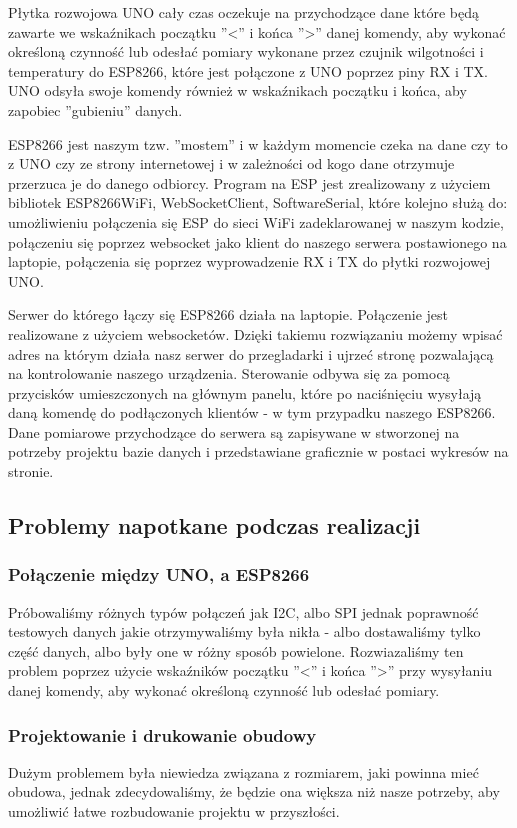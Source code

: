 \documentclass[12pt]{article}
\begin{document}
Płytka rozwojowa UNO cały czas oczekuje na przychodzące dane które będą zawarte we wskaźnikach początku ''<'' i końca ''>'' danej komendy, aby wykonać określoną czynność lub odesłać pomiary wykonane przez czujnik wilgotności i temperatury do ESP8266, które jest połączone z UNO poprzez piny RX i TX. UNO odsyła swoje komendy również w wskaźnikach początku i końca, aby zapobiec ''gubieniu'' danych.

ESP8266 jest naszym tzw. ''mostem'' i w każdym momencie czeka na dane czy to z UNO czy ze strony internetowej i w zależności od kogo dane otrzymuje przerzuca je do danego odbiorcy.
Program na ESP jest zrealizowany z użyciem bibliotek ESP8266WiFi, WebSocketClient, SoftwareSerial, które kolejno służą do: umożliwieniu połączenia się ESP do sieci WiFi zadeklarowanej w naszym kodzie, połączeniu się poprzez websocket jako klient do naszego serwera postawionego na laptopie, połączenia się poprzez wyprowadzenie RX i TX do płytki rozwojowej UNO.

Serwer do którego łączy się ESP8266 działa na laptopie. Połączenie jest realizowane z użyciem websocketów. Dzięki takiemu rozwiązaniu możemy wpisać adres na którym działa nasz serwer do przegladarki i ujrzeć stronę pozwalającą na kontrolowanie naszego urządzenia. Sterowanie odbywa się za pomocą przycisków umieszczonych na głównym panelu, które po naciśnięciu wysyłają daną komendę do podłączonych klientów - w tym przypadku naszego ESP8266. Dane pomiarowe przychodzące do serwera są zapisywane w stworzonej na potrzeby projektu bazie danych i przedstawiane graficznie w postaci wykresów na stronie.

\newpage
\subsection{Problemy napotkane podczas realizacji}
\subsubsection{Połączenie między UNO, a ESP8266}
Próbowaliśmy różnych typów połączeń jak I2C, albo SPI jednak poprawność testowych danych jakie otrzymywaliśmy była nikła - albo dostawaliśmy tylko część danych, albo były one w różny sposób powielone.
Rozwiazaliśmy ten problem poprzez użycie wskaźników początku ''<'' i końca ''>'' przy wysyłaniu danej komendy, aby wykonać określoną czynność lub odesłać pomiary. 
\subsubsection{Projektowanie i drukowanie obudowy}
Dużym problemem była niewiedza związana z rozmiarem, jaki powinna mieć obudowa, jednak zdecydowaliśmy, że będzie ona większa niż nasze potrzeby, aby umożliwić łatwe rozbudowanie projektu w przyszłości. 
\end{document}
